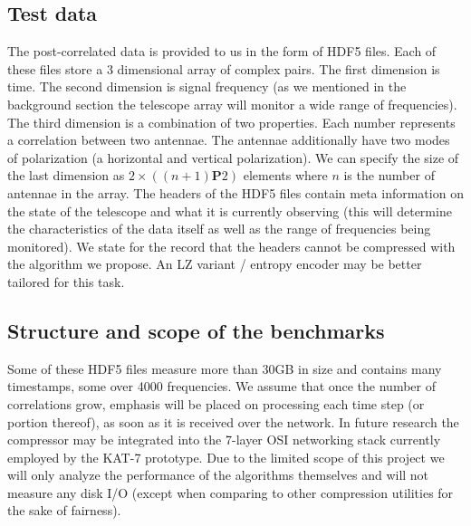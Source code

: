 \documentclass{acm_proc_article-sp}
\begin{document}
\subsection{Test data}
The post-correlated data is provided to us in the form of HDF5 files. Each of these files store a 3 dimensional array of complex pairs. The first dimension is time. The second dimension is signal frequency (as we mentioned
in the background section the telescope array will monitor a wide range of frequencies). The third dimension is a combination of two properties. Each number represents a correlation between two antennae. The antennae additionally
have two modes of polarization (a horizontal and vertical polarization). We can specify the size of the last dimension as $2\times((n+1)\mathbf{P}2)$ elements where $n$ is the number of
antennae in the array. The headers of the HDF5 files contain meta information on the state of the telescope and what it is currently observing (this will determine the characteristics of the data itself as well as 
the range of frequencies being monitored). We state for the record that the headers cannot be compressed with the algorithm we propose. An LZ variant / entropy encoder may be better tailored for this task.
\subsection{Structure and scope of the benchmarks}
Some of these HDF5 files measure more than 30GB in size and contains many timestamps, some over 4000 frequencies. We assume that once the number of correlations grow, emphasis will be placed on processing each 
time step (or portion thereof), as soon as it is received over the network. In future research the compressor may be integrated into the 7-layer OSI networking stack currently employed by the KAT-7 prototype. Due to the limited
scope of this project we will only analyze the performance of the algorithms themselves and will not measure any disk I/O (except when comparing to other compression utilities for the sake of fairness).
\end{document}
